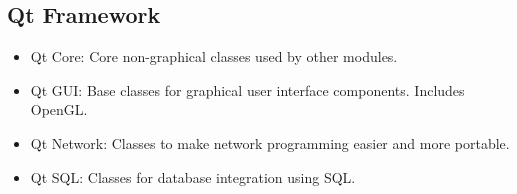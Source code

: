 
\begin{issues}
\issueDraft
\end{issues}

\subsection{Qt Framework}
\begin{itemize}
\item Qt Core: Core non-graphical classes used by other modules.
\item Qt GUI: Base classes for graphical user interface components. Includes OpenGL.
\item Qt Network: Classes to make network programming easier and more portable.
\item Qt SQL: Classes for database integration using SQL.
\end{itemize}

